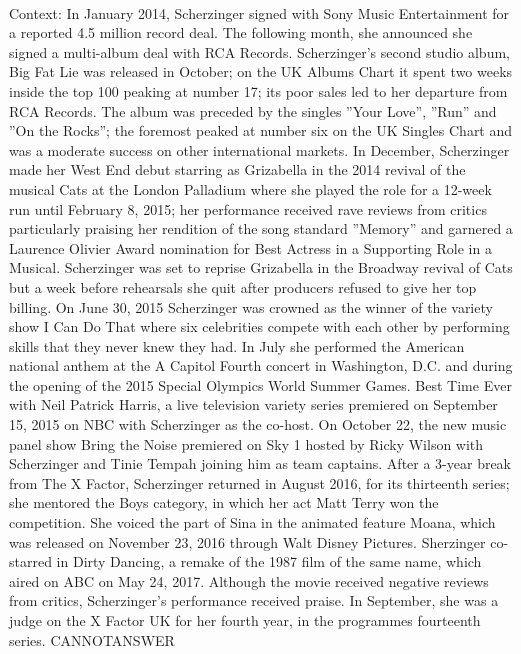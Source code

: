 \documentclass[11pt,a4paper, onecolumn]{article}
\begin{document}
\\ Context: In January 2014, Scherzinger signed with Sony Music Entertainment for a reported  4.5 million record deal. The following month, she announced she signed a multi-album deal with RCA Records. Scherzinger's second studio album, Big Fat Lie was released in October; on the UK Albums Chart it spent two weeks inside the top 100 peaking at number 17; its poor sales led to her departure from RCA Records. The album was preceded by the singles ''Your Love'', ''Run'' and ''On the Rocks''; the foremost peaked at number six on the UK Singles Chart and was a moderate success on other international markets. In December, Scherzinger made her West End debut starring as Grizabella in the 2014 revival of the musical Cats at the London Palladium where she played the role for a 12-week run until February 8, 2015; her performance received rave reviews from critics particularly praising her rendition of the song standard ''Memory'' and garnered a Laurence Olivier Award nomination for Best Actress in a Supporting Role in a Musical. Scherzinger was set to reprise Grizabella in the Broadway revival of Cats but a week before rehearsals she quit after producers refused to give her top billing. On June 30, 2015 Scherzinger was crowned as the winner of the variety show I Can Do That where six celebrities compete with each other by performing skills that they never knew they had. In July she performed the American national anthem at the A Capitol Fourth concert in Washington, D.C. and during the opening of the 2015 Special Olympics World Summer Games. Best Time Ever with Neil Patrick Harris, a live television variety series premiered on September 15, 2015 on NBC with Scherzinger as the co-host. On October 22, the new music panel show Bring the Noise premiered on Sky 1 hosted by Ricky Wilson with Scherzinger and Tinie Tempah joining him as team captains. After a 3-year break from The X Factor, Scherzinger returned in August 2016, for its thirteenth series; she mentored the Boys category, in which her act Matt Terry won the competition. She voiced the part of Sina in the animated feature Moana, which was released on November 23, 2016 through Walt Disney Pictures. Sherzinger co-starred in Dirty Dancing, a remake of the 1987 film of the same name, which aired on ABC on May 24, 2017. Although the movie received negative reviews from critics, Scherzinger's performance received praise. In September, she was a judge on the X Factor UK for her fourth year, in the programmes fourteenth series. CANNOTANSWER
\end{document}
